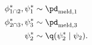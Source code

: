 \begin{align}
  \phi_{1 \cap 2}^{*}, \psi_{1}^{*} &\sim \pd_{\text{meld}, 1} \\ 
  \phi_{2 \cap 3}^{*}, \psi_{3}^{*} &\sim \pd_{\text{meld}, 3} \\
  \psi_{2}^{*} &\sim \q(\psi_{2}^{*} \mid \psi_{2}).
  \label{eqn:stage-two-proposals}
\end{align}